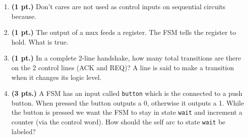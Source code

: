 \documentclass{article}
\begin{document}
\begin{enumerate}
\pagebreak
\item{\bf(1 pt.)} Don't cares are not used as control inputs on sequential
circuits because.

\item{\bf(1 pt.)} The output of a mux feeds a register.  The FSM tells the
register to hold.  What is true.

\item{\bf(1 pt.)} In a complete 2-line handshake, how many total transitions 
are there on the 2 control lines (ACK and REQ)?  A line is said to make a 
transition when it changes its logic level.

\item {\bf (3 pts.)} 
A FSM has an input called \verb+button+ which is the connected to 
a push button.  When pressed the button outputs a 0, 
otherwise it outputs a 1.  While the button is pressed we want 
the FSM to stay in state \verb+wait+ and increment a counter 
(via the control word).  How should the self arc to state 
\verb+wait+ be labeled?


\end{enumerate}
\end{document}
